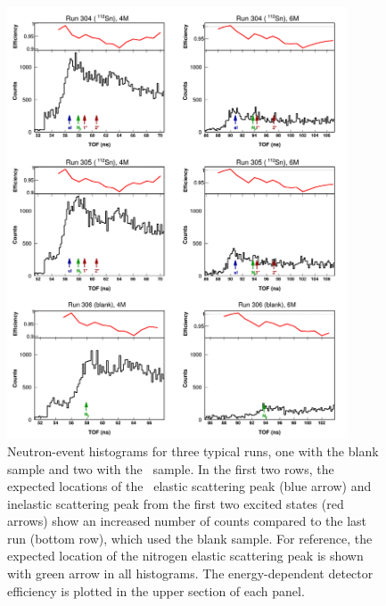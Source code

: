 \begin{figure}[tb]
    \centering
    \includegraphics[width=0.9\textwidth]{figures/tiledRunData.png}
    \caption[Histograms from typical runs showing neutron elastic scattering peak]
    {
        Neutron-event histograms for three typical runs, one with the blank
        sample and two with the \snTwelve\ sample.
        In the first two rows, the expected locations of the \snTwelve\ elastic scattering peak 
        (blue arrow)
        and inelastic scattering peak from the first two excited states (red arrows) show an
        increased number of counts compared to the last run (bottom row), which used the blank
        sample. For reference, the expected location of the nitrogen elastic scattering
        peak is shown with green arrow in all histograms.
        The energy-dependent detector efficiency is plotted in the upper section of
        each panel.
    }
    \label{tiledRunData}
\end{figure}

